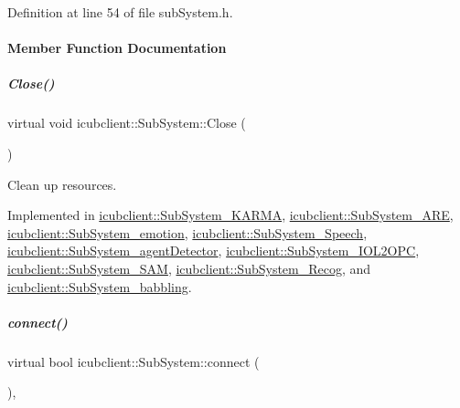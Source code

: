 Definition at line 54 of file sub\+System.\+h.



\paragraph{Member Function Documentation}
\mbox{\label{group__icubclient__subsystems_af327c56ad0d33aada77f825d96fb47f2}} 
\subparagraph{\texorpdfstring{Close()}{Close()}}
{\footnotesize\ttfamily virtual void icubclient\+::\+Sub\+System\+::\+Close (\begin{DoxyParamCaption}{ }\end{DoxyParamCaption})\hspace{0.3cm}{\ttfamily [pure virtual]}}



Clean up resources. 



Implemented in \hyperlink{group__icubclient__subsystems_acdec5cffb610e7b93d2d51ac22765b21}{icubclient\+::\+Sub\+System\+\_\+\+K\+A\+R\+MA}, \hyperlink{group__icubclient__subsystems_a570bb3cc879e0547a04e82b231a9f57f}{icubclient\+::\+Sub\+System\+\_\+\+A\+RE}, \hyperlink{group__icubclient__subsystems_a44727eb284e1291c193559d9ecc12a50}{icubclient\+::\+Sub\+System\+\_\+emotion}, \hyperlink{group__icubclient__subsystems_a12a3920b40dbabaf9eb7d14d81c172da}{icubclient\+::\+Sub\+System\+\_\+\+Speech}, \hyperlink{group__icubclient__subsystems_ac36d06ae1d94f17a8eb3581664479127}{icubclient\+::\+Sub\+System\+\_\+agent\+Detector}, \hyperlink{group__icubclient__subsystems_a15246d09894da753d1672f58b6af8556}{icubclient\+::\+Sub\+System\+\_\+\+I\+O\+L2\+O\+PC}, \hyperlink{group__icubclient__subsystems_a75b9591c2bbd9c20f1cd222d538c8c45}{icubclient\+::\+Sub\+System\+\_\+\+S\+AM}, \hyperlink{group__icubclient__subsystems_a8f41f3c801e0d0b705927dbc56959137}{icubclient\+::\+Sub\+System\+\_\+\+Recog}, and \hyperlink{group__icubclient__subsystems_a9865dd2f02610e3ea80923b7194981ae}{icubclient\+::\+Sub\+System\+\_\+babbling}.

\mbox{\label{group__icubclient__subsystems_a5fc84b6e51ec56f91323280b7da52dc8}} 
\subparagraph{\texorpdfstring{connect()}{connect()}}
{\footnotesize\ttfamily virtual bool icubclient\+::\+Sub\+System\+::connect (\begin{DoxyParamCaption}{ }\end{DoxyParamCaption})\hspace{0.3cm}{\ttfamily [protected]}, {}}



